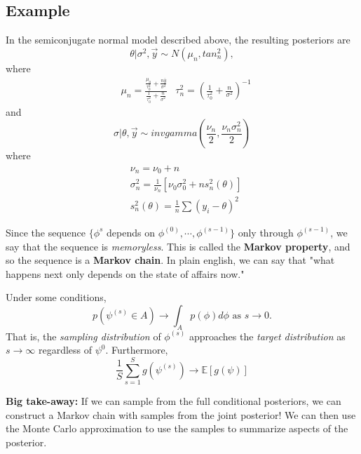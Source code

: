 \documentclass[titlepage, 12pt, leqno]{article}
\begin{document}
\subsection{Example}
In the semiconjugate normal model described above, the resulting posteriors are
\[
\theta|\sigma^{2},\vec y \sim N(\mu_{n}, tan_{n}^{2}),
\]
where 
\begin{align*}
    &\mu_{n} = \frac{\frac{\mu_{0}}{\tau_{0}^{2}} + \frac{n\bar y}{\sigma^{2}}}
    {\frac{1}{\tau_{0}^{2}} + \frac{n}{\sigma^{2}}}
    & \tau_{n}^{2} = \left(\frac{1}{\tau_{0}^{2}} + \frac{n}{\sigma^{2}}
        \right)^{-1}
\end{align*}
and
\[
\sigma|\theta, \vec y \sim  invgamma\left(\frac{\nu_{n}}{2}, 
    \frac{\nu_{n}\sigma^{2}_{n}}{2}\right)
\]
where
\begin{align*}
    &\nu_{n} = \nu_{0} + n \\
    &\sigma_{n}^{2} = \frac{1}{\nu_{n}}[\nu_{0}
    \sigma^{2}_{0} + ns_{n}^{2}(\theta)]\\
    &s_{n}^{2}(\theta) = \frac{1}{n}\sum (y_{i}-\theta)^{2}
\end{align*}

\begin{definition}
    Since the sequence $\{\phi^{s}$ depends on $\phi^{(0)}, \cdots ,
    \phi^{(s-1)}\}$ only through $\phi^{(s-1)}$, we say that the sequence is
    \textit{memoryless}. This is called the \textbf{Markov property}, and so 
    the sequence is a \textbf{Markov chain}. In plain english, we can say that
    "what happens next only depends on the state of affairs now."
\end{definition}

Under some conditions,
\[
p(\psi^{(s)}\in A) \rightarrow \int_{A}p(\phi)d \phi \text{ as }s\rightarrow 0.
\]
That is, the \textit{sampling distribution} of $\phi^{(s)}$ approaches the
\textit{target distribution} as $s \rightarrow \infty$ regardless of 
$\psi^{0}$. Furthermore, 
\[
    \frac{1}{S}\sum_{s=1}^{S}g(\psi^{(s)}) \rightarrow \mathbb{E}[g(\psi)]
\]
\begin{note}
    \textbf{Big take-away:} If we can sample from the full conditional
    posteriors, we can construct a Markov chain with samples from the joint
    posterior! We can then use the Monte Carlo approximation to use the samples
    to summarize aspects of the posterior.
\end{note}

\pagebreak
\end{document}
